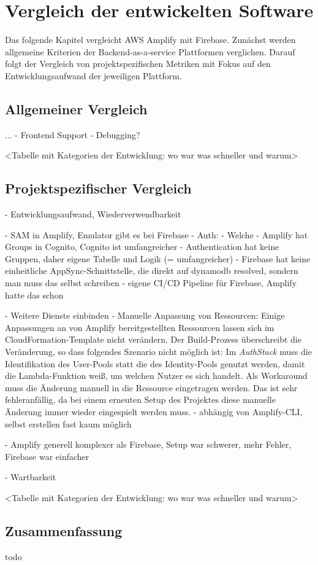 \chapter{Vergleich der entwickelten Software}

Das folgende Kapitel vergleicht \ac{AWS} Amplify mit Firebase. Zunächst werden allgemeine Kriterien der Backend-as-a-service Plattformen verglichen. Darauf folgt der Vergleich von projektspezifischen Metriken mit Fokus auf den Entwicklungsaufwand der jeweiligen Plattform.

\section{Allgemeiner Vergleich}

...
- Frontend Support
- Debugging?

<Tabelle mit Kategorien der Entwicklung: wo war was schneller und warum>

\section{Projektspezifischer Vergleich}

  - Entwicklungsaufwand, Wiederverwendbarkeit

  - SAM in Amplify, Emulator gibt es bei Firebase
  - Auth:
    - Welche
    - Amplify hat Groups in Cognito, Cognito ist umfangreicher
    - Authentication hat keine Gruppen, daher eigene Tabelle und Logik (= umfangreicher)
  - Firebase hat keine einheitliche AppSync-Schnittstelle, die direkt auf dynamodb resolved, sondern man muss das selbst schreiben
  - eigene CI/CD Pipeline für Firebase, Amplify hatte das schon

  - Weitere Dienste einbinden
    - Manuelle Anpassung von Ressourcen: Einige Anpassungen an von Amplify bereitgestellten Ressourcen lassen sich im CloudFormation-Template nicht verändern. Der Build-Prozess überschreibt die Veränderung, so dass folgendes Szenario nicht möglich ist: Im \textit{AuthStack} muss die Identifikation des User-Pools statt die des Identity-Pools genutzt werden, damit die Lambda-Funktion weiß, um welchen Nutzer es sich handelt. Als Workaround muss die Änderung manuell in die Ressource eingetragen werden. Das ist sehr fehleranfällig, da bei einem erneuten Setup des Projektes diese manuelle Änderung immer wieder eingespielt werden muss.
    - abhängig von Amplify-CLI, selbst erstellen fast kaum möglich

    - Amplify generell komplexer als Firebase, Setup war schwerer, mehr Fehler, Firebase war einfacher

    - Wartbarkeit

    <Tabelle mit Kategorien der Entwicklung: wo war was schneller und warum>

\section{Zusammenfassung}

todo